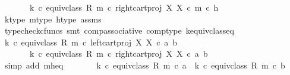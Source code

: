 \begin{isabellebody}
\ \ \ \ \ \ \ {\isacharparenleft}{\kern0pt}k\ {\isasymcirc}\isactrlsub c\ equiv{\isacharunderscore}{\kern0pt}class\ {\isacharparenleft}{\kern0pt}R{\isacharcomma}{\kern0pt}\ m{\isacharparenright}{\kern0pt}{\isacharparenright}{\kern0pt}\ {\isasymcirc}\isactrlsub c\ right{\isacharunderscore}{\kern0pt}cart{\isacharunderscore}{\kern0pt}proj\ X\ X\ {\isasymcirc}\isactrlsub c\ m\ {\isasymcirc}\isactrlsub c\ h{\isachardoublequoteclose}\isanewline
\ \ \ \ \ \ \isamarkupfalse%
\ k{\isacharunderscore}{\kern0pt}type\ m{\isacharunderscore}{\kern0pt}type\ h{\isacharunderscore}{\kern0pt}type\ assms\ \isanewline
\ \ \ \ \ \ \isamarkupfalse%
\ {\isacharparenleft}{\kern0pt}typecheck{\isacharunderscore}{\kern0pt}cfuncs{\isacharcomma}{\kern0pt}\ smt\ comp{\isacharunderscore}{\kern0pt}associative{}\ comp{\isacharunderscore}{\kern0pt}type\ k{\isacharunderscore}{\kern0pt}equiv{\isacharunderscore}{\kern0pt}class{\isacharunderscore}{\kern0pt}eq{\isacharparenright}{\kern0pt}\isanewline
\ \ \ \ \isamarkupfalse%
\ \isamarkupfalse%
\ {\isachardoublequoteopen}{\isacharparenleft}{\kern0pt}k\ {\isasymcirc}\isactrlsub c\ equiv{\isacharunderscore}{\kern0pt}class\ {\isacharparenleft}{\kern0pt}R{\isacharcomma}{\kern0pt}\ m{\isacharparenright}{\kern0pt}{\isacharparenright}{\kern0pt}\ {\isasymcirc}\isactrlsub c\ left{\isacharunderscore}{\kern0pt}cart{\isacharunderscore}{\kern0pt}proj\ X\ X\ {\isasymcirc}\isactrlsub c\ {\isasymlangle}a{\isacharcomma}{\kern0pt}\ b{\isasymrangle}\ {\isacharequal}{\kern0pt}\isanewline
\ \ \ \ \ \ \ {\isacharparenleft}{\kern0pt}k\ {\isasymcirc}\isactrlsub c\ equiv{\isacharunderscore}{\kern0pt}class\ {\isacharparenleft}{\kern0pt}R{\isacharcomma}{\kern0pt}\ m{\isacharparenright}{\kern0pt}{\isacharparenright}{\kern0pt}\ {\isasymcirc}\isactrlsub c\ right{\isacharunderscore}{\kern0pt}cart{\isacharunderscore}{\kern0pt}proj\ X\ X\ {\isasymcirc}\isactrlsub c\ {\isasymlangle}a{\isacharcomma}{\kern0pt}\ b{\isasymrangle}{\isachardoublequoteclose}\isanewline
\ \ \ \ \ \ \isamarkupfalse%
\ {\isacharparenleft}{\kern0pt}simp\ add{\isacharcolon}{\kern0pt}\ m{\isacharunderscore}{\kern0pt}h{\isacharunderscore}{\kern0pt}eq{\isacharparenright}{\kern0pt}\isanewline
\ \ \ \ \isamarkupfalse%
\ \isamarkupfalse%
\ {\isachardoublequoteopen}{\isacharparenleft}{\kern0pt}k\ {\isasymcirc}\isactrlsub c\ equiv{\isacharunderscore}{\kern0pt}class\ {\isacharparenleft}{\kern0pt}R{\isacharcomma}{\kern0pt}\ m{\isacharparenright}{\kern0pt}{\isacharparenright}{\kern0pt}\ {\isasymcirc}\isactrlsub c\ a\ {\isacharequal}{\kern0pt}\ {\isacharparenleft}{\kern0pt}k\ {\isasymcirc}\isactrlsub c\ equiv{\isacharunderscore}{\kern0pt}class\ {\isacharparenleft}{\kern0pt}R{\isacharcomma}{\kern0pt}\ m{\isacharparenright}{\kern0pt}{\isacharparenright}{\kern0pt}\ {\isasymcirc}\isactrlsub c\ b{\isachardoublequoteclose}\isanewline

\end{isabellebody}
